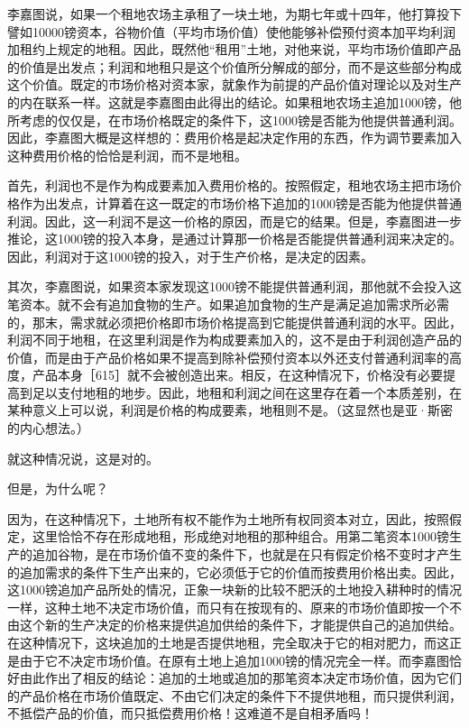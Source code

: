 李嘉图说，如果一个租地农场主承租了一块土地，为期七年或十四年，他打算投下譬如10000镑资本，谷物价值（平均市场价值）使他能够补偿预付资本加平均利润加租约上规定的地租。因此，既然他“租用”土地，对他来说，平均市场价值即产品的价值是出发点；利润和地租只是这个价值所分解成的部分，而不是这些部分构成这个价值。既定的市场价格对资本家，就象作为前提的产品价值对理论以及对生产的内在联系一样。这就是李嘉图由此得出的结论。如果租地农场主追加1000镑，他所考虑的仅仅是，在市场价格既定的条件下，这1000镑是否能为他提供普通利润。因此，李嘉图大概是这样想的：费用价格是起决定作用的东西，作为调节要素加入这种费用价格的恰恰是利润，而不是地租。

首先，利润也不是作为构成要素加入费用价格的。按照假定，租地农场主把市场价格作为出发点，计算着在这一既定的市场价格下追加的1000镑是否能为他提供普通利润。因此，这一利润不是这一价格的原因，而是它的结果。但是，李嘉图进一步推论，这1000镑的投入本身，是通过计算那一价格是否能提供普通利润来决定的。因此，利润对于这1000镑的投入，对于生产价格，是决定的因素。

其次，李嘉图说，如果资本家发现这1000镑不能提供普通利润，那他就不会投入这笔资本。就不会有追加食物的生产。如果追加食物的生产是满足追加需求所必需的，那末，需求就必须把价格即市场价格提高到它能提供普通利润的水平。因此，利润不同于地租，在这里利润是作为构成要素加入的，这不是由于利润创造产品的价值，而是由于产品价格如果不提高到除补偿预付资本以外还支付普通利润率的高度，产品本身［615］就不会被创造出来。相反，在这种情况下，价格没有必要提高到足以支付地租的地步。因此，地租和利润之间在这里存在着一个本质差别，在某种意义上可以说，利润是价格的构成要素，地租则不是。（这显然也是亚·斯密的内心想法。）

就这种情况说，这是对的。

但是，为什么呢？

因为，在这种情况下，土地所有权不能作为土地所有权同资本对立，因此，按照假定，这里恰恰不存在形成地租，形成绝对地租的那种组合。用第二笔资本1000镑生产的追加谷物，是在市场价值不变的条件下，也就是在只有假定价格不变时才产生的追加需求的条件下生产出来的，它必须低于它的价值而按费用价格出卖。因此，这1000镑追加产品所处的情况，正象一块新的比较不肥沃的土地投入耕种时的情况一样，这种土地不决定市场价值，而只有在按现有的、原来的市场价值即按一个不由这个新的生产决定的价格来提供追加供给的条件下，才能提供自己的追加供给。在这种情况下，这块追加的土地是否提供地租，完全取决于它的相对肥力，而这正是由于它不决定市场价值。在原有土地上追加1000镑的情况完全一样。而李嘉图恰好由此作出了相反的结论：追加的土地或追加的那笔资本决定市场价值，因为它们的产品价格在市场价值既定、不由它们决定的条件下不提供地租，而只提供利润，不抵偿产品的价值，而只抵偿费用价格！这难道不是自相矛盾吗！

